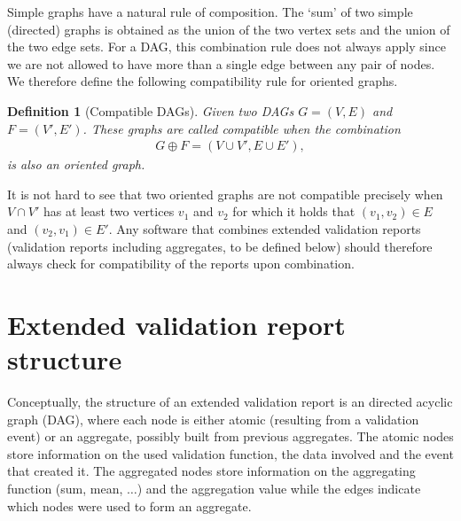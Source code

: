 \documentclass[a4paper, 11pt,titlepage]{article}
\newtheorem{definition}{Definition}
\begin{document}
Simple graphs have a natural rule of composition. The `sum' of two simple
(directed) graphs is obtained as the union of the two vertex sets and the union
of the two edge sets. For a DAG, this combination rule does not always apply
since we are not allowed to have more than a single edge between any pair of
nodes.  We therefore define the following compatibility rule for oriented
graphs.
\begin{definition}[Compatible DAGs]
Given two DAGs $G=(V,E)$ and $F=(V',E')$. These graphs are called
\emph{compatible} when the combination
\begin{align*}
G\oplus F = (V\cup V', E\cup E'),
\end{align*}
is also an oriented graph.
\end{definition}
It is not hard to see that two oriented graphs are not compatible precisely
when $V\cap V'$ has at least two vertices $v_1$ and $v_2$ for which it holds
that $(v_1,v_2)\in E$ and $(v_2,v_1)\in E'$. Any software that combines
extended validation reports (validation reports including aggregates, to be
defined below) should therefore always check for compatibility of the reports
upon combination.








\section{Extended validation report structure}
Conceptually, the structure of an extended validation report is an directed
acyclic graph (DAG), where each node is either atomic (resulting from a
validation event) or an aggregate, possibly built from previous aggregates. The
atomic nodes store information on the used validation function, the data
involved and the event that created it. The aggregated nodes store information
on the aggregating function (sum, mean, $\ldots$) and the aggregation value
while the edges indicate which nodes were used to form an aggregate. 
\end{document}

